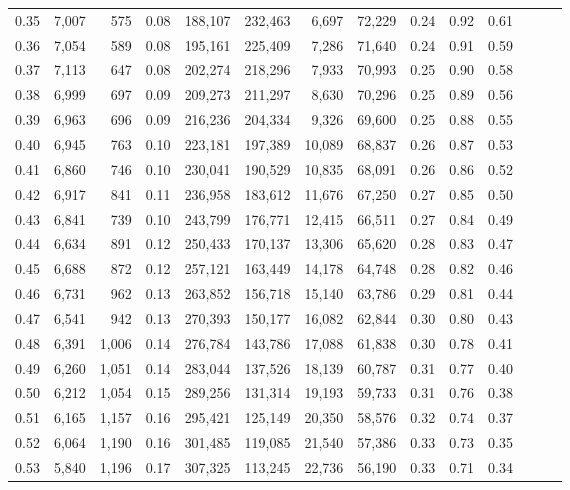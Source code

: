 \begin{tabular}{rrrrrrrrrrrrrr}
0.35 &  7,007 &    575 &  0.08 &  188,107 &  232,463 &   6,697 &  72,229 &  0.24 &  0.92 &      0.61 \\
0.36 &  7,054 &    589 &  0.08 &  195,161 &  225,409 &   7,286 &  71,640 &  0.24 &  0.91 &      0.59 \\
0.37 &  7,113 &    647 &  0.08 &  202,274 &  218,296 &   7,933 &  70,993 &  0.25 &  0.90 &      0.58 \\
0.38 &  6,999 &    697 &  0.09 &  209,273 &  211,297 &   8,630 &  70,296 &  0.25 &  0.89 &      0.56 \\
0.39 &  6,963 &    696 &  0.09 &  216,236 &  204,334 &   9,326 &  69,600 &  0.25 &  0.88 &      0.55 \\
0.40 &  6,945 &    763 &  0.10 &  223,181 &  197,389 &  10,089 &  68,837 &  0.26 &  0.87 &      0.53 \\
0.41 &  6,860 &    746 &  0.10 &  230,041 &  190,529 &  10,835 &  68,091 &  0.26 &  0.86 &      0.52 \\
0.42 &  6,917 &    841 &  0.11 &  236,958 &  183,612 &  11,676 &  67,250 &  0.27 &  0.85 &      0.50 \\
0.43 &  6,841 &    739 &  0.10 &  243,799 &  176,771 &  12,415 &  66,511 &  0.27 &  0.84 &      0.49 \\
0.44 &  6,634 &    891 &  0.12 &  250,433 &  170,137 &  13,306 &  65,620 &  0.28 &  0.83 &      0.47 \\
0.45 &  6,688 &    872 &  0.12 &  257,121 &  163,449 &  14,178 &  64,748 &  0.28 &  0.82 &      0.46 \\
0.46 &  6,731 &    962 &  0.13 &  263,852 &  156,718 &  15,140 &  63,786 &  0.29 &  0.81 &      0.44 \\
0.47 &  6,541 &    942 &  0.13 &  270,393 &  150,177 &  16,082 &  62,844 &  0.30 &  0.80 &      0.43 \\
0.48 &  6,391 &  1,006 &  0.14 &  276,784 &  143,786 &  17,088 &  61,838 &  0.30 &  0.78 &      0.41 \\
0.49 &  6,260 &  1,051 &  0.14 &  283,044 &  137,526 &  18,139 &  60,787 &  0.31 &  0.77 &      0.40 \\
0.50 &  6,212 &  1,054 &  0.15 &  289,256 &  131,314 &  19,193 &  59,733 &  0.31 &  0.76 &      0.38 \\
0.51 &  6,165 &  1,157 &  0.16 &  295,421 &  125,149 &  20,350 &  58,576 &  0.32 &  0.74 &      0.37 \\
0.52 &  6,064 &  1,190 &  0.16 &  301,485 &  119,085 &  21,540 &  57,386 &  0.33 &  0.73 &      0.35 \\
0.53 &  5,840 &  1,196 &  0.17 &  307,325 &  113,245 &  22,736 &  56,190 &  0.33 &  0.71 &      0.34 \\

\end{tabular}

